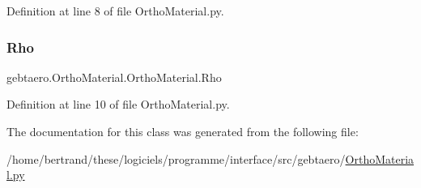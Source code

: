 Definition at line 8 of file Ortho\+Material.\+py.

\mbox{\label{classgebtaero_1_1_ortho_material_1_1_ortho_material_aa1fa00a17cf09210c0daf5d7bbd07d0d}} 
\subsubsection{\texorpdfstring{Rho}{Rho}}
{\footnotesize\ttfamily gebtaero.\+Ortho\+Material.\+Ortho\+Material.\+Rho}



Definition at line 10 of file Ortho\+Material.\+py.



The documentation for this class was generated from the following file\+:\begin{DoxyCompactItemize}
\item 
/home/bertrand/these/logiciels/programme/interface/src/gebtaero/\hyperlink{_ortho_material_8py}{Ortho\+Material.\+py}\end{DoxyCompactItemize}
